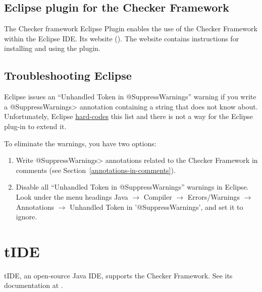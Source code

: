 \label{eclipse-plug-in}         %
\subsection{Eclipse plugin for the Checker Framework\label{eclipse-plugin}}

The Checker framework Eclipse Plugin enables the use of the Checker
Framework within the Eclipse IDE\@.
Its website ().
The website contains instructions for installing and using the plugin.


\subsection{Troubleshooting Eclipse\label{eclipse-troubleshooting}}

Eclipse issues an ``Unhandled Token in @SuppressWarnings'' warning if you
write a \<@SuppressWarnings> annotation containing a string that does not
know about.  Unfortunately, Eclipse
\href{https://bugs.eclipse.org/bugs/show_bug.cgi?id=122475}{hard-codes}
this list and there is not a way for the Eclipse plug-in to extend it.

To eliminate the warnings, you have two options:

\begin{enumerate}
\item
Write \<@SuppressWarnings> annotations related to the Checker Framework in
comments (see Section~\ref{annotations-in-comments}).
\item
  Disable all ``Unhandled Token in @SuppressWarnings'' warnings in Eclipse.
  Look under the menu headings Java $\rightarrow$ Compiler $\rightarrow$ Errors/Warnings $\rightarrow$ Annotations $\rightarrow$ Unhandled Token in '@SuppressWarnings', and set it to ignore.
\end{enumerate}


\section{tIDE\label{tide}}

\begin{sloppypar}
tIDE, an open-source Java IDE, supports the Checker Framework.  See its
documentation at .
\end{sloppypar}


